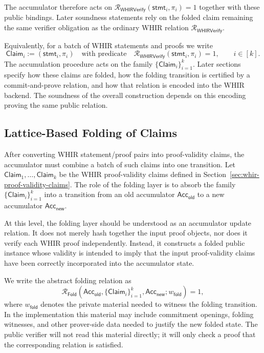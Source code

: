 \documentclass[11pt]{article}
\theoremstyle{definition}
\newcommand{\Acc}{\mathsf{Acc}}
\newcommand{\Rwhir}{\mathcal{R}_{\mathsf{WHIRVerify}}}
\newcommand{\Rfold}{\mathcal{R}_{\mathsf{Fold}}}
\begin{document}
The accumulator therefore acts on \(\Rwhir(\mathsf{stmt}_i,\pi_i)=1\) together
with these public bindings. Later soundness statements rely on the folded claim
remaining the same verifier obligation as the ordinary WHIR relation
\(\Rwhir\).

Equivalently, for a batch of WHIR statements and proofs we write
\[
  \mathsf{Claim}_i :=
  (\mathsf{stmt}_i,\pi_i)
  \quad\text{with predicate}\quad
  \Rwhir(\mathsf{stmt}_i,\pi_i)=1,
  \qquad i\in[k].
\]
The accumulation procedure acts on the family
$\{\mathsf{Claim}_i\}_{i=1}^k$. Later sections specify how these claims are
folded, how the folding transition is certified by a commit-and-prove relation,
and how that relation is encoded into the WHIR backend. The soundness of the
overall construction depends on this encoding proving the same public relation.

\subsection{Lattice-Based Folding of Claims}
\label{sec:lattice-folding-of-claims}

After converting WHIR statement/proof pairs into proof-validity claims, the
accumulator must combine a batch of such claims into one transition.
Let $\mathsf{Claim}_1,\ldots,\mathsf{Claim}_k$ be the WHIR proof-validity
claims defined in Section~\ref{sec:whir-proof-validity-claims}.
The role of the folding layer is to absorb the family
$\{\mathsf{Claim}_i\}_{i=1}^k$ into a transition from an old accumulator
$\Acc_{\mathsf{old}}$ to a new accumulator $\Acc_{\mathsf{new}}$.

At this level, the folding layer should be understood as an accumulator update
relation. It does not merely hash together the input proof objects, nor does it
verify each WHIR proof independently. Instead, it constructs a folded public
instance whose validity is intended to imply that the input proof-validity claims
have been correctly incorporated into the accumulator state.

We write the abstract folding relation as
\[
  \Rfold\!\left(
    \Acc_{\mathsf{old}},
    \{\mathsf{Claim}_i\}_{i=1}^k,
    \Acc_{\mathsf{new}};
    w_{\mathsf{fold}}
  \right)=1,
\]
where $w_{\mathsf{fold}}$ denotes the private material needed to witness the
folding transition. In the implementation this material may include commitment
openings, folding witnesses, and other prover-side data needed to justify the
new folded state. The public verifier will not read this material directly; it
will only check a proof that the corresponding relation is satisfied.
\end{document}
